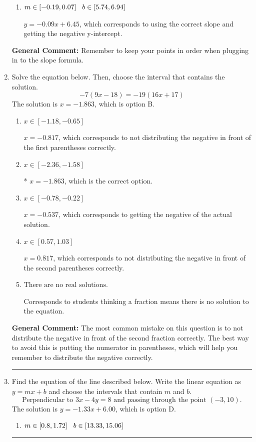 \documentclass{extbook}[14pt]
\newcommand{\litem}[1]{\item #1

\rule{\textwidth}{0.4pt}}
\begin{document}
\begin{enumerate}
{\begin{enumerate}[label=\Alph*.]
 $y = -0.09x -13$, which corresponds to using the correct slope/equation but not distributing correctly using the first point.
\item \( m \in [-0.19, 0.07] \hspace*{3mm} b \in [5.74, 6.94] \)

 $y = -0.09x + 6.45$, which corresponds to using the correct slope and getting the negative y-intercept.
\end{enumerate}

\textbf{General Comment:} Remember to keep your points in order when plugging in to the slope formula.
}
\litem{
Solve the equation below. Then, choose the interval that contains the solution.
\[ -7(9x -18) = -19(16x + 17) \]
The solution is \( x = -1.863 \), which is option B.\begin{enumerate}[label=\Alph*.]
\item \( x \in [-1.18, -0.65] \)

$x = -0.817$, which corresponds to not distributing the negative in front of the first parentheses correctly.
\item \( x \in [-2.36, -1.58] \)

* $x = -1.863$, which is the correct option.
\item \( x \in [-0.78, -0.22] \)

$x = -0.537$, which corresponds to getting the negative of the actual solution.
\item \( x \in [0.57, 1.03] \)

$x = 0.817$, which corresponds to not distributing the negative in front of the second parentheses correctly.
\item \( \text{There are no real solutions.} \)

Corresponds to students thinking a fraction means there is no solution to the equation.
\end{enumerate}

\textbf{General Comment:} The most common mistake on this question is to not distribute the negative in front of the second fraction correctly. The best way to avoid this is putting the numerator in parentheses, which will help you remember to distribute the negative correctly.
}
\litem{
Find the equation of the line described below. Write the linear equation as $ y=mx+b $ and choose the intervals that contain $m$ and $b$.
\[ \text{Perpendicular to } 3 x - 4 y = 8 \text{ and passing through the point } (-3, 10). \]
The solution is \( y = -1.33x + 6.00 \), which is option D.\begin{enumerate}[label=\Alph*.]
\item \( m \in [0.8, 1.72] \hspace*{3mm} b \in [13.33, 15.06] \)


\end{enumerate}}
\end{enumerate}
\end{document}
